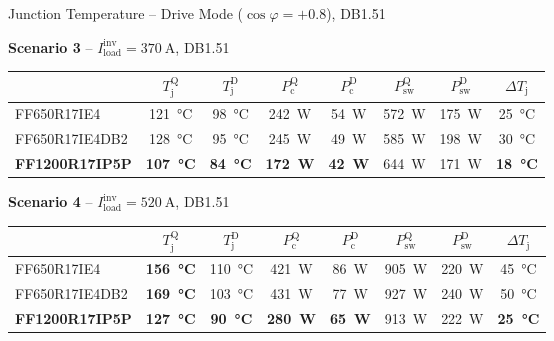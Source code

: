 \documentclass[aspectratio=169, 10pt]{beamer}
\newcommand{\good}[1]{\textcolor{goodgreen}{\textbf{#1}}}
\newcommand{\warn}[1]{\textcolor{warnred}{\textbf{#1}}}
\begin{document}
\begin{frame}{Junction Temperature -- Drive Mode ($\cos\varphi = +0.8$), DB1.51}
  \small
  \renewcommand{\arraystretch}{1.45}

  \textbf{Scenario 3} -- $I_\text{load}^\text{inv} = \SI{370}{\ampere}$, DB1.51
  \begin{center}
  \begin{tabular}{l c c c c c c c}
    \toprule
    & $T_\text{j}^\text{Q}$ & $T_\text{j}^\text{D}$ & $P_\text{c}^\text{Q}$ & $P_\text{c}^\text{D}$ & $P_\text{sw}^\text{Q}$ & $P_\text{sw}^\text{D}$ & $\Delta T_\text{j}$ \\
    \midrule
    \rowcolor{rowgray}
    FF650R17IE4    & \SI{121}{\celsius} & \SI{98}{\celsius}  & \SI{242}{W} & \SI{54}{W} & \SI{572}{W} & \SI{175}{W} & \SI{25}{\celsius} \\
    FF650R17IE4DB2 & \SI{128}{\celsius} & \SI{95}{\celsius}  & \SI{245}{W} & \SI{49}{W} & \SI{585}{W} & \SI{198}{W} & \SI{30}{\celsius} \\
    \rowcolor{rowgray}
    \textbf{FF1200R17IP5P} & \good{\SI{107}{\celsius}} & \good{\SI{84}{\celsius}}  & \good{\SI{172}{W}} & \good{\SI{42}{W}} & \SI{644}{W} & \SI{171}{W} & \good{\SI{18}{\celsius}} \\
    \bottomrule
  \end{tabular}
  \end{center}

  \vspace{4pt}
  \textbf{Scenario 4} -- $I_\text{load}^\text{inv} = \SI{520}{\ampere}$, DB1.51
  \begin{center}
  \begin{tabular}{l c c c c c c c}
    \toprule
    & $T_\text{j}^\text{Q}$ & $T_\text{j}^\text{D}$ & $P_\text{c}^\text{Q}$ & $P_\text{c}^\text{D}$ & $P_\text{sw}^\text{Q}$ & $P_\text{sw}^\text{D}$ & $\Delta T_\text{j}$ \\
    \midrule
    \rowcolor{rowgray}
    FF650R17IE4    & \warn{\SI{156}{\celsius}} & \SI{110}{\celsius} & \SI{421}{W} & \SI{86}{W} & \SI{905}{W} & \SI{220}{W} & \SI{45}{\celsius} \\
    FF650R17IE4DB2 & \warn{\SI{169}{\celsius}} & \SI{103}{\celsius} & \SI{431}{W} & \SI{77}{W} & \SI{927}{W} & \SI{240}{W} & \SI{50}{\celsius} \\
    \rowcolor{rowgray}
    \textbf{FF1200R17IP5P} & \good{\SI{127}{\celsius}} & \good{\SI{90}{\celsius}}  & \good{\SI{280}{W}} & \good{\SI{65}{W}} & \SI{913}{W} & \SI{222}{W} & \good{\SI{25}{\celsius}} \\
    \bottomrule
  \end{tabular}
  \end{center}
\end{frame}
\end{document}
